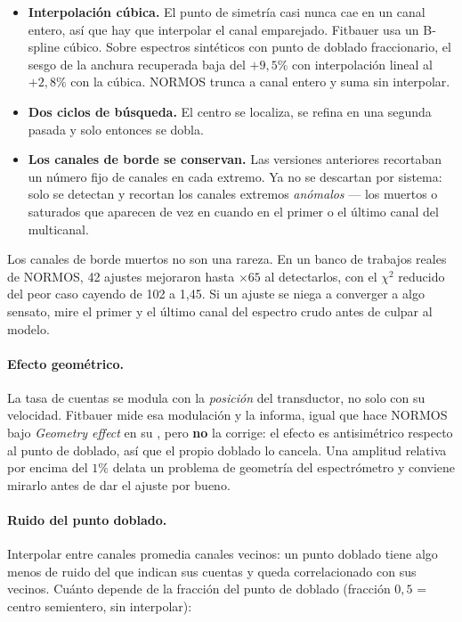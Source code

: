 \begin{itemize}[nosep]
  \item \textbf{Interpolación cúbica.} El punto de simetría casi nunca cae en un
        canal entero, así que hay que interpolar el canal emparejado. Fitbauer
        usa un B-spline cúbico. Sobre espectros sintéticos con punto de doblado
        fraccionario, el sesgo de la anchura recuperada baja del $+9{,}5\%$ con
        interpolación lineal al $+2{,}8\%$ con la cúbica. NORMOS trunca a canal
        entero y suma sin interpolar.
  \item \textbf{Dos ciclos de búsqueda.} El centro se localiza, se refina en una
        segunda pasada y solo entonces se dobla.
  \item \textbf{Los canales de borde se conservan.} Las versiones anteriores
        recortaban un número fijo de canales en cada extremo. Ya no se descartan
        por sistema: solo se detectan y recortan los canales extremos
        \emph{anómalos} --- los muertos o saturados que aparecen de vez en cuando
        en el primer o el último canal del multicanal.
\end{itemize}

\begin{truco}
Los canales de borde muertos no son una rareza. En un banco de trabajos reales
de NORMOS, 42 ajustes mejoraron hasta $\times 65$ al detectarlos, con el
$\chi^2$ reducido del peor caso cayendo de 102 a 1,45. Si un ajuste se niega a
converger a algo sensato, mire el primer y el último canal del espectro crudo
antes de culpar al modelo.
\end{truco}

\paragraph{Efecto geométrico.} La tasa de cuentas se modula con la
\emph{posición} del transductor, no solo con su velocidad. Fitbauer mide esa
modulación y la informa, igual que hace NORMOS bajo \emph{Geometry effect} en su
, pero \textbf{no} la corrige: el efecto es antisimétrico respecto al
punto de doblado, así que el propio doblado lo cancela. Una amplitud relativa
por encima del $1\%$ delata un problema de geometría del espectrómetro y
conviene mirarlo antes de dar el ajuste por bueno.

\paragraph{Ruido del punto doblado.} Interpolar entre canales promedia canales
vecinos: un punto doblado tiene algo menos de ruido del que indican sus cuentas
y queda correlacionado con sus vecinos. Cuánto depende de la fracción del punto
de doblado (fracción $0{,}5$ = centro semientero, sin interpolar):

